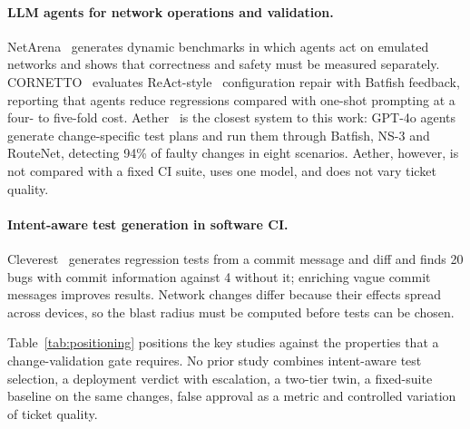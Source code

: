 \documentclass[pdflatex,iicol,sn-mathphys-num]{sn-jnl}%
\theoremstyle{thmstyletwo}%
\begin{document}
\paragraph{LLM agents for network operations and validation.} NetArena~\cite{zhou2026netarena} generates dynamic benchmarks in which agents act on emulated networks and shows that correctness and safety must be measured separately. CORNETTO~\cite{asadli2026cornetto} evaluates ReAct-style~\cite{yao2023react} configuration repair with Batfish feedback, reporting that agents reduce regressions compared with one-shot prompting at a four- to five-fold cost. Aether~\cite{auge2026aether} is the closest system to this work: GPT-4o agents generate change-specific test plans and run them through Batfish, NS-3 and RouteNet, detecting 94\% of faulty changes in eight scenarios. Aether, however, is not compared with a fixed CI suite, uses one model, and does not vary ticket quality.

\paragraph{Intent-aware test generation in software CI.} Cleverest~\cite{liu2026cleverest} generates regression tests from a commit message and diff and finds 20 bugs with commit information against 4 without it; enriching vague commit messages improves results. Network changes differ because their effects spread across devices, so the blast radius must be computed before tests can be chosen.

Table~\ref{tab:positioning} positions the key studies against the properties that a change-validation gate requires. No prior study combines intent-aware test selection, a deployment verdict with escalation, a two-tier twin, a fixed-suite baseline on the same changes, false approval as a metric and controlled variation of ticket quality.
\end{document}
